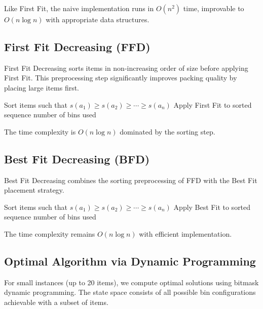 \documentclass[11pt,a4paper]{article}
\begin{document}
Like First Fit, the naive implementation runs in $O(n^2)$ time, improvable to $O(n \log n)$ with appropriate data structures.

\subsection{First Fit Decreasing (FFD)}

First Fit Decreasing sorts items in non-increasing order of size before applying First Fit. This preprocessing step significantly improves packing quality by placing large items first.

\begin{algorithm}[H]
\caption{First Fit Decreasing}
\begin{algorithmic}[1]
\STATE Sort items such that $s(a_1) \geq s(a_2) \geq \cdots \geq s(a_n)$
\STATE Apply First Fit to sorted sequence
\RETURN number of bins used
\end{algorithmic}
\end{algorithm}

The time complexity is $O(n \log n)$ dominated by the sorting step.

\subsection{Best Fit Decreasing (BFD)}

Best Fit Decreasing combines the sorting preprocessing of FFD with the Best Fit placement strategy.

\begin{algorithm}[H]
\caption{Best Fit Decreasing}
\begin{algorithmic}[1]
\STATE Sort items such that $s(a_1) \geq s(a_2) \geq \cdots \geq s(a_n)$
\STATE Apply Best Fit to sorted sequence
\RETURN number of bins used
\end{algorithmic}
\end{algorithm}

The time complexity remains $O(n \log n)$ with efficient implementation.

\subsection{Optimal Algorithm via Dynamic Programming}

For small instances (up to 20 items), we compute optimal solutions using bitmask dynamic programming. The state space consists of all possible bin configurations achievable with a subset of items.
\end{document}
